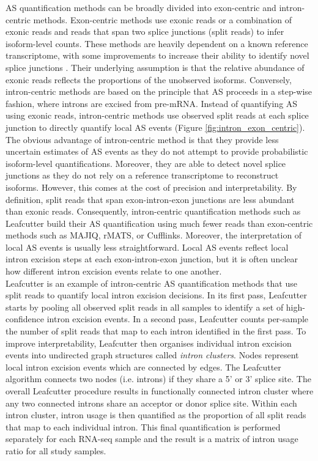AS quantification methods can be broadly divided into exon-centric and intron-centric methods. Exon-centric methods use exonic reads or a combination of exonic reads and reads that span two splice junctions (split reads) to infer isoform-level counts. These methods are heavily dependent on a known reference transcriptome, with some improvements to increase their ability to identify novel splice junctions \cite{Vaquero-Garcia2016-dv}. Their underlying assumption is that the relative abundance of exonic reads reflects the proportions of the unobserved isoforms. Conversely, intron-centric methods are based on the principle that AS proceeds in a step-wise fashion, where introns are excised from pre-mRNA. Instead of quantifying AS using exonic reads, intron-centric methods use observed split reads at each splice junction to directly quantify local AS events (Figure \ref{fig:intron_exon_centric}). The obvious advantage of intron-centric method is that they provide less uncertain estimates of AS events as they do not attempt to provide probabilistic isoform-level quantifications. Moreover, they are able to detect novel splice junctions as they do not rely on a reference transcriptome to reconstruct isoforms. However, this comes at the cost of precision and interpretability. By definition, split reads that span exon-intron-exon junctions are less abundant than exonic reads. Consequently, intron-centric quantification methods such as Leafcutter build their AS quantification using much fewer reads than exon-centric methods such as MAJIQ, rMATS, or Cufflinks. Moreover, the interpretation of local AS events is usually less straightforward. Local AS events reflect local intron excision steps at each exon-intron-exon junction, but it is often unclear how different intron excision events relate to one another. \\

Leafcutter is an example of intron-centric AS quantification methods that use split reads to quantify local intron excision decisions. In its first pass, Leafcutter starts by pooling all observed split reads in all samples to identify a set of high-confidence intron excision events. In a second pass, Leafcutter counts per-sample the number of split reads that map to each intron identified in the first pass. To improve interpretability, Leafcutter then organises individual intron excision events into undirected graph structures called \textit{intron clusters}. Nodes represent local intron excision events which are connected by edges. The Leafcutter algorithm connects two nodes (i.e. introns) if they share a 5' or 3' splice site. The overall Leafcutter procedure results in functionally connected intron cluster where any two connected introns share an acceptor or donor splice site. Within each intron cluster, intron usage is then quantified as the proportion of all split reads that map to each individual intron. This final quantification is performed separately for each RNA-seq sample and the result is a matrix of intron usage ratio for all study samples. 



